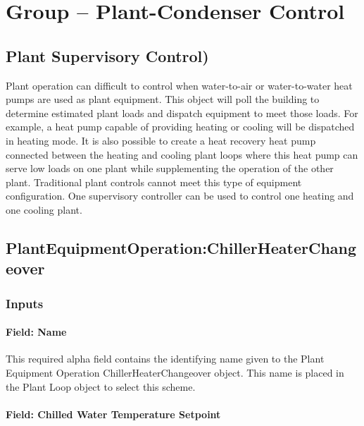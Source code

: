 \section{Group -- Plant-Condenser Control}\label{group-plant-condenser-control}

\subsection{Plant Supervisory Control)}\label{operation-schemes-plant-supervisory-control}

Plant operation can difficult to control when water-to-air or water-to-water heat pumps are used as plant equipment. This object will poll the building to determine estimated plant loads and dispatch equipment to meet those loads. For example, a heat pump capable of providing heating or cooling will be dispatched in heating mode. It is also possible to create a heat recovery heat pump connected between the heating and cooling plant loops where this heat pump can serve low loads on one plant while supplementing the operation of the other plant. Traditional plant controls cannot meet this type of equipment configuration. One supervisory controller can be used to control one heating and one cooling plant.

\subsection{PlantEquipmentOperation:ChillerHeaterChangeover}\label{plantequipmentoperationchillerheaterchangeover}

\subsubsection{Inputs}\label{inputs-plantequipmentoperationchillerheaterchangeover}

\paragraph{Field: Name}\label{field-name-plantequipmentoperationchillerheaterchangeover}

This required alpha field contains the identifying name given to the Plant Equipment Operation ChillerHeaterChangeover object. This name is placed in the Plant Loop object to select this scheme.

\paragraph{Field: Chilled Water Temperature Setpoint}\label{field-chilled-water-temp-setpoint-plantequipmentoperationchillerheaterchangeover}

